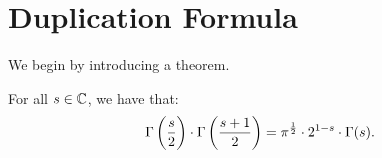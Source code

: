 \setcounter{section}{0}
\setcounter{theorem}{0}


\section{Duplication Formula}

We begin by introducing a theorem.
\begin{theorem}\label{thm:z-duplication}
For all $s \in \mathbb{C}$, we have that:
\begin{align*}
    \Gamma\left( \frac{s}{2} \right) \cdot \Gamma\left( \frac{s+1}{2} \right) = \pi ^{\frac{1}{2}} \cdot 2^{1-s} \cdot \Gamma(s).
\end{align*}
\end{theorem}

